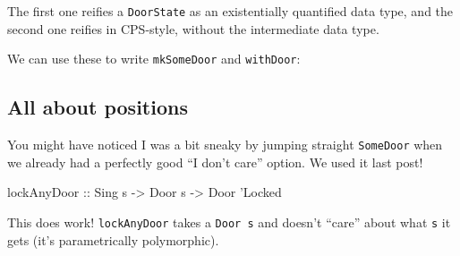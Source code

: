 \documentclass[]{article}
\newenvironment{Shaded}{}{}
\newcommand{\KeywordTok}[1]{\textcolor[rgb]{0.00,0.44,0.13}{\textbf{#1}}}
\newcommand{\DataTypeTok}[1]{\textcolor[rgb]{0.56,0.13,0.00}{#1}}
\newcommand{\CharTok}[1]{\textcolor[rgb]{0.25,0.44,0.63}{#1}}
\newcommand{\CommentTok}[1]{\textcolor[rgb]{0.38,0.63,0.69}{\textit{#1}}}
\newcommand{\OtherTok}[1]{\textcolor[rgb]{0.00,0.44,0.13}{#1}}
\newcommand{\FunctionTok}[1]{\textcolor[rgb]{0.02,0.16,0.49}{#1}}
\newcommand{\NormalTok}[1]{#1}
\begin{document}
The first one reifies a \texttt{DoorState} as an existentially quantified data
type, and the second one reifies in CPS-style, without the intermediate data
type.

We can use these to write \texttt{mkSomeDoor} and \texttt{withDoor}:

\begin{Shaded}
\end{Shaded}

\subsection{All about positions}\label{all-about-positions}

You might have noticed I was a bit sneaky by jumping straight \texttt{SomeDoor}
when we already had a perfectly good ``I don't care'' option. We used it last
post!

\begin{Shaded}
\begin{Highlighting}[]
\OtherTok{lockAnyDoor ::} \DataTypeTok{Sing}\NormalTok{ s }\OtherTok{->} \DataTypeTok{Door}\NormalTok{ s }\OtherTok{->} \DataTypeTok{Door} \CharTok{'Locked}
\end{Highlighting}
\end{Shaded}

This does work! \texttt{lockAnyDoor} takes a \texttt{Door\ s} and doesn't
``care'' about what \texttt{s} it gets (it's parametrically polymorphic).
\end{document}
